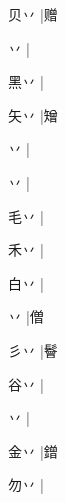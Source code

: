 \begin{multicols}{2}
{{\cjk{}贝丷{\cnjzr{}}}\mktsJzrVerticalBar{}{\cjk{}{\cnsym{}　}{\cnsym{}　}{\cnsym{}　}}|{\cjk{}赠}\par
{丷{\cnjzr{}}}\mktsJzrVerticalBar{}{\cjk{}{\cnsym{}　}{\cnsym{}　}{\cnsym{}　}}|{}\par
{\cjk{}黑丷{\cnjzr{}}}\mktsJzrVerticalBar{}{\cjk{}{\cnsym{}　}{\cnsym{}　}{\cnsym{}　}}|{}\par
{\cjk{}矢丷{\cnjzr{}}}\mktsJzrVerticalBar{}{\cjk{}{\cnsym{}　}{\cnsym{}　}{\cnsym{}　}}|{\cjk{}矰}\par
{丷{\cnjzr{}}}\mktsJzrVerticalBar{}{\cjk{}{\cnsym{}　}{\cnsym{}　}{\cnsym{}　}}|{}\par
{丷{\cnjzr{}}}\mktsJzrVerticalBar{}{\cjk{}{\cnsym{}　}{\cnsym{}　}{\cnsym{}　}}|{}\par
{\cjk{}毛丷{\cnjzr{}}}\mktsJzrVerticalBar{}{\cjk{}{\cnsym{}　}{\cnsym{}　}{\cnsym{}　}}|{}\par
{\cjk{}禾丷{\cnjzr{}}}\mktsJzrVerticalBar{}{\cjk{}{\cnsym{}　}{\cnsym{}　}{\cnsym{}　}}|{}\par
{\cjk{}白丷{\cnjzr{}}}\mktsJzrVerticalBar{}{\cjk{}{\cnsym{}　}{\cnsym{}　}{\cnsym{}　}}|{}\par
{丷{\cnjzr{}}}\mktsJzrVerticalBar{}{\cjk{}{\cnsym{}　}{\cnsym{}　}{\cnsym{}　}}|{\cjk{}僧}\par
{\cjk{}彡丷{\cnjzr{}}}|{\cjk{}鬙}\par
{\cjk{}谷丷{\cnjzr{}}}\mktsJzrVerticalBar{}{\cjk{}{\cnsym{}　}{\cnsym{}　}{\cnsym{}　}}|{}\par
{丷{\cnjzr{}}}|{}\par
{\cjk{}金丷{\cnjzr{}}}\mktsJzrVerticalBar{}{\cjk{}{\cnsym{}　}{\cnsym{}　}{\cnsym{}　}}|{\cjk{}鏳}\par
{\cjk{}勿丷{\cnjzr{}}}\mktsJzrVerticalBar{}{\cjk{}{\cnsym{}　}{\cnsym{}　}{\cnsym{}　}}|{}\par
}
\end{multicols}
